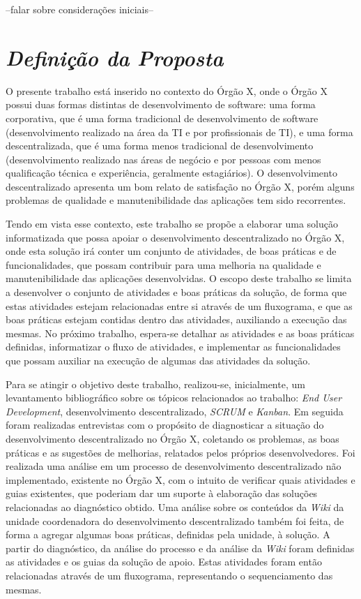 --falar sobre considerações iniciais--

\section{\textit{Definição da Proposta}}

O presente trabalho está inserido no contexto do Órgão X, onde o Órgão X possui duas formas distintas de desenvolvimento de software: uma forma corporativa, que é uma forma tradicional de desenvolvimento de software (desenvolvimento realizado na área da TI e por profissionais de TI), e uma forma descentralizada, que é uma forma menos tradicional de desenvolvimento (desenvolvimento realizado nas áreas de negócio e por pessoas com menos qualificação técnica e experiência, geralmente estagiários).
O desenvolvimento descentralizado apresenta um bom relato de satisfação no Órgão X, porém alguns problemas de qualidade e manutenibilidade das aplicações tem sido recorrentes.

Tendo em vista esse contexto, este trabalho se propõe a elaborar uma solução informatizada que possa apoiar o desenvolvimento descentralizado no Órgão X, onde esta solução irá conter um conjunto de atividades, de boas práticas e de funcionalidades, que possam contribuir para uma melhoria na qualidade e manutenibilidade das aplicações desenvolvidas. O escopo deste trabalho se limita a desenvolver o conjunto de atividades e boas práticas da solução, de forma que estas atividades estejam relacionadas entre si através de um fluxograma, e que as boas práticas estejam contidas dentro das atividades, auxiliando a execução das mesmas. No próximo trabalho, espera-se detalhar as atividades e as boas práticas definidas, informatizar o fluxo de atividades, e implementar as funcionalidades que possam auxiliar na execução de algumas das atividades da solução.

Para se atingir o objetivo deste trabalho, realizou-se, inicialmente, um levantamento bibliográfico sobre os tópicos relacionados ao trabalho: \textit{End User Development}, desenvolvimento descentralizado, \textit{SCRUM} e \textit{Kanban}. Em seguida foram realizadas entrevistas com o propósito de diagnosticar a situação do desenvolvimento descentralizado no Órgão X, coletando os problemas, as boas práticas e as sugestões de melhorias, relatados pelos próprios desenvolvedores. Foi realizada uma análise em um processo de desenvolvimento descentralizado não implementado, existente no Órgão X, com o intuito de verificar quais atividades e guias existentes, que poderiam dar um suporte à elaboração das soluções relacionadas ao diagnóstico obtido. Uma análise sobre os conteúdos da \textit{Wiki} da unidade coordenadora do desenvolvimento descentralizado também foi feita, de forma a agregar algumas boas práticas, definidas pela unidade, à solução. A partir do diagnóstico, da análise do processo e da análise da \textit{Wiki} foram definidas as atividades e os guias da solução de apoio. Estas atividades foram então relacionadas através de um fluxograma, representando o sequenciamento das mesmas.

